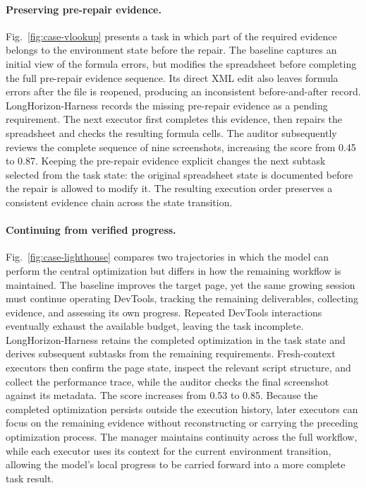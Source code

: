 \paragraph{Preserving pre-repair evidence.}
Fig.~\ref{fig:case-vlookup} presents a task in which part of the
required evidence belongs to the environment state before the repair.
The baseline captures an initial view of the formula errors, but
modifies the spreadsheet before completing the full pre-repair evidence
sequence. Its direct XML edit also leaves formula errors after the file
is reopened, producing an inconsistent before-and-after record.
LongHorizon-Harness records the missing pre-repair evidence as a
pending requirement. The next executor first completes this evidence,
then repairs the spreadsheet and checks the resulting formula cells.
The auditor subsequently reviews the complete sequence of nine
screenshots, increasing the score from 0.45 to 0.87. Keeping the
pre-repair evidence explicit changes the next subtask selected from the
task state: the original spreadsheet state is documented before the
repair is allowed to modify it. The resulting execution order preserves
a consistent evidence chain across the state transition.


\paragraph{Continuing from verified progress.}
Fig.~\ref{fig:case-lighthouse} compares two trajectories in which the
model can perform the central optimization but differs in how the
remaining workflow is maintained. The baseline improves the target
page, yet the same growing session must continue operating DevTools,
tracking the remaining deliverables, collecting evidence, and assessing
its own progress. Repeated DevTools interactions eventually exhaust
the available budget, leaving the task incomplete.
LongHorizon-Harness retains the completed optimization in the task
state and derives subsequent subtasks from the remaining requirements.
Fresh-context executors then confirm the page state, inspect the
relevant script structure, and collect the performance trace, while
the auditor checks the final screenshot against its metadata. The
score increases from 0.53 to 0.85. Because the completed optimization
persists outside the execution history, later executors can focus on
the remaining evidence without reconstructing or carrying the preceding
optimization process. The manager maintains continuity across the full
workflow, while each executor uses its context for the current
environment transition, allowing the model's local progress to be
carried forward into a more complete task result.


